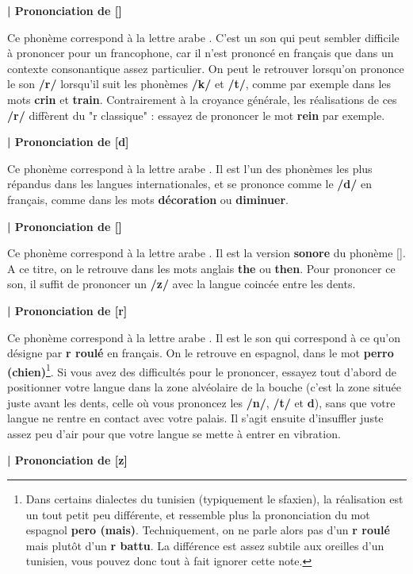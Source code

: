 \textbf{| Prononciation de  [\textchi]}

Ce phonème correspond à la lettre arabe . C'est un son qui peut sembler difficile à prononcer pour un francophone, car il n'est prononcé en français que dans un contexte consonantique assez particulier. On peut le retrouver lorsqu'on prononce le son \textbf{/r/} lorsqu'il suit les phonèmes \textbf{/k/} et \textbf{/t/}, comme par exemple dans les mots \textbf{crin} et \textbf{train}. Contrairement à la croyance générale, les réalisations de ces \textbf{/r/} diffèrent du "r classique" : essayez de prononcer le mot \textbf{rein} par exemple.


\textbf{| Prononciation de  [d]}

Ce phonème correspond à la lettre arabe . Il est l'un des phonèmes les plus répandus dans les langues internationales, et se prononce comme le \textbf{/d/} en français, comme dans les mots \textbf{décoration} ou \textbf{diminuer}.


\textbf{| Prononciation de  [\dh]}

Ce phonème correspond à la lettre arabe . Il est la version \textbf{sonore} du phonème  [\texttheta]. A ce titre, on le retrouve dans les mots anglais \textbf{the} ou \textbf{then}. Pour prononcer ce son, il suffit de prononcer un \textbf{/z/} avec la langue coincée entre les dents.


\textbf{| Prononciation de  [r]}

Ce phonème correspond à la lettre arabe . Il est le son qui correspond à ce qu'on désigne par \textbf{r roulé} en français. On le retrouve en espagnol, dans le mot \textbf{perro (chien)}\footnote{Dans certains dialectes du tunisien (typiquement le sfaxien), la réalisation est un tout petit peu différente, et ressemble plus la prononciation du mot espagnol \textbf{pero (mais)}. Techniquement, on ne parle alors pas d'un \textbf{r roulé} mais plutôt d'un \textbf{r battu}. La différence est assez subtile aux oreilles d'un tunisien, vous pouvez donc tout à fait ignorer cette note.}. Si vous avez des difficultés pour le prononcer, essayez tout d'abord de positionner votre langue dans la zone alvéolaire de la bouche (c'est la zone située juste avant les dents, celle où vous prononcez les \textbf{/n/}, \textbf{/t/} et \textbf{d}), sans que votre langue ne rentre en contact avec votre palais. Il s'agit ensuite d'insuffler juste assez peu d'air pour que votre langue se mette à entrer en vibration.


\textbf{| Prononciation de  [z]}

